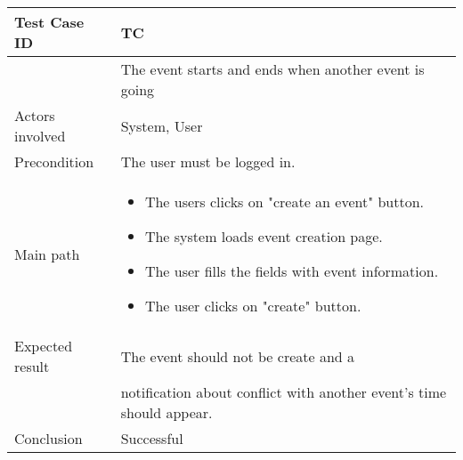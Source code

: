 \begin{center} \begin{tabular}{|l|l|}
  \hline
  Test Case ID & TC \z\\
  \hline


   & The event starts and ends when another event is going\\
  \hline
  Actors involved & System, User\\
   \hline
  Precondition & The user must be logged in.\\
  \hline
  Main path &   \begin{minipage}{5in}
    \vskip 4pt
            \begin{itemize}
              \item The users clicks on "create an event" button.
              \item The system loads event creation page.
              \item The user fills the fields with event information.
              \item The user clicks on "create" button.
            \end{itemize}
    \vskip 4pt
  \end{minipage}  \\
  \hline
  Expected result & The event should not be create and a\\
  & notification about conflict with another event's time should appear.\\
  \hline
  Conclusion & Successful\\
  \hline
\end{tabular} \end{center}



